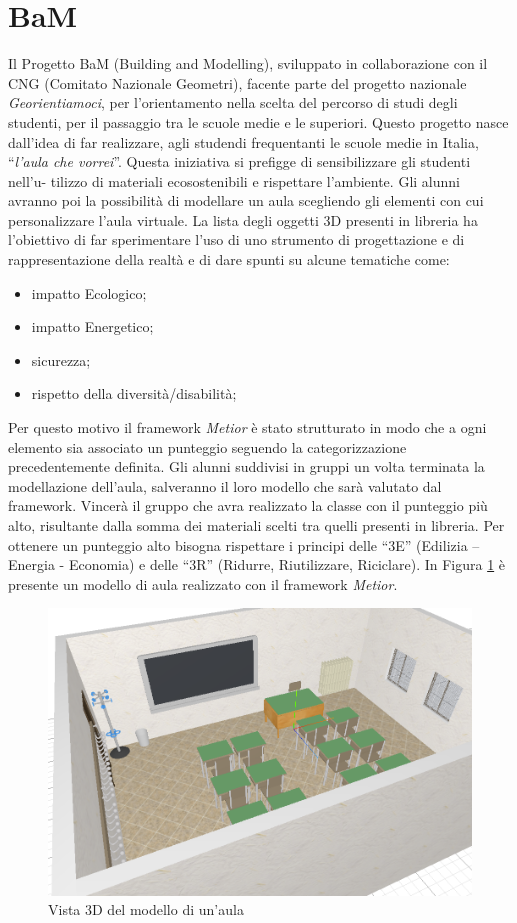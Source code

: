 \section{BaM}
\label{sec:chapter_4_section_1}
Il Progetto BaM (Building and Modelling), sviluppato in collaborazione con il CNG (Comitato Nazionale Geometri),
facente parte del progetto nazionale \emph{Georientiamoci}, per l’orientamento nella scelta
del percorso di studi degli studenti, per il passaggio tra le scuole medie e le superiori.
Questo progetto nasce dall'idea di far realizzare, agli studendi frequentanti le scuole medie in Italia,
``\emph{l'aula che vorrei}''. Questa iniziativa si prefigge di sensibilizzare gli studenti nell’u-
tilizzo di materiali ecosostenibili e rispettare l’ambiente.
Gli alunni avranno poi la possibilità di modellare un aula scegliendo gli elementi con cui personalizzare l’aula virtuale.
La lista degli oggetti 3D presenti in libreria ha l’obiettivo di far sperimentare l’uso di uno strumento di progettazione
e di rappresentazione della realtà e di dare spunti su alcune tematiche come:
\begin{itemize}
\item impatto Ecologico;
\item impatto Energetico;
\item sicurezza;
\item rispetto della diversità/disabilità;
\end{itemize}
Per questo motivo il framework \emph{Metior} è stato strutturato in modo che a ogni elemento sia associato un punteggio seguendo
la categorizzazione precedentemente definita.
Gli alunni suddivisi in gruppi un volta terminata la modellazione dell'aula, salveranno il loro modello che sarà valutato
dal framework.
Vincerà il gruppo che avra realizzato la classe con il punteggio più alto, risultante dalla somma dei materiali scelti
tra quelli presenti in libreria. Per ottenere un punteggio alto bisogna rispettare i principi delle
“3E” (Edilizia – Energia - Economia) e delle “3R” (Ridurre, Riutilizzare, Riciclare). In Figura \ref{fig:3daula} è presente
un modello di aula realizzato con il framework \emph{Metior}.\\
\begin{figure}[htbp] %
   \centering
   \includegraphics[width=0.6\linewidth]{images/3d-school-2}
   \caption{Vista 3D del modello di un'aula}
   \label{fig:3daula}
   \end{figure}
\newpage

